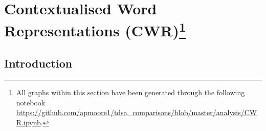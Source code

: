 \section[Contextualised Word Representations (CWR)]{Contextualised Word Representations (CWR)\footnote{All graphs within this section have been generated through the following notebook \url{https://github.com/apmoore1/tdsa_comparisons/blob/master/analysis/CWR.ipynb}.}}
\label{section:aug_cwr}
\subsection{Introduction}
\label{section:aug_cwr_intro}

  
